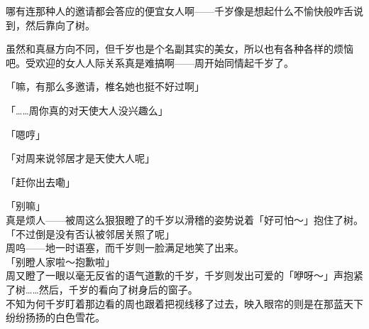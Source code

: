 哪有连那种人的邀请都会答应的便宜女人啊——千岁像是想起什么不愉快般咋舌说到，然后靠向了树。

虽然和真昼方向不同，但千岁也是个名副其实的美女，所以也有各种各样的烦恼吧。受欢迎的女人人际关系真是难搞啊——周开始同情起千岁了。

「嘛，有那么多邀请，椎名她也挺不好过啊」

「……周你真的对天使大人没兴趣么」

「嗯哼」

「对周来说邻居才是天使大人呢」

「赶你出去嘞」

「别嘛」\\

真是烦人——被周这么狠狠瞪了的千岁以滑稽的姿势说着「好可怕～」抱住了树。\\

「不过倒是没有否认被邻居关照了呢」\\

周呜——地一时语塞，而千岁则一脸满足地笑了出来。\\

「别瞪人家啦～抱歉啦」\\

周又瞪了一眼以毫无反省的语气道歉的千岁，千岁则发出可爱的「咿呀～」声抱紧了树……然后，千岁的看向了树身后的窗子。\\

不知为何千岁盯着那边看的周也跟着把视线移了过去，映入眼帘的则是在那蓝天下纷纷扬扬的白色雪花。\\

